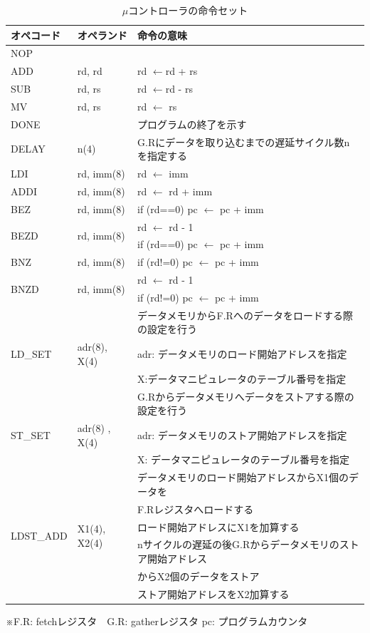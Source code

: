 {\begin{table}[p]
\begin{center}
\caption{$\mu$コントローラの命令セット}
\label{table:iset}
\begin{tabular}{|l|l|l|} \hline
オペコード & オペランド & 命令の意味 \\ \hline
NOP & & \\ \hline
ADD & rd, rd & rd $\leftarrow$rd + rs \\ \hline
SUB & rd, rs & rd $\leftarrow$rd - rs \\ \hline
MV & rd, rs & rd $\leftarrow$ rs\\ \hline
DONE & & プログラムの終了を示す\\ \hline
DELAY & n(4) & G.Rにデータを取り込むまでの遅延サイクル数nを指定する \\ \hline
LDI & rd, imm(8) & rd $\leftarrow$  imm \\ \hline
ADDI & rd, imm(8) & rd $\leftarrow$ rd  + imm \\ \hline
BEZ & rd, imm(8) & if (rd==0) pc $\leftarrow$ pc + imm \\ \hline
\multirow{2}{*}{BEZD} & \multirow{2}{*}{rd, imm(8)} & rd $\leftarrow$ rd - 1 \\
& &  if (rd==0) pc $\leftarrow$ pc + imm \\ \hline
BNZ & rd, imm(8) & if (rd!=0) pc $\leftarrow$ pc + imm \\ \hline
\multirow{2}{*}{BNZD} & \multirow{2}{*}{rd, imm(8)} &  rd $\leftarrow$ rd - 1\\ 
& & if (rd!=0) pc $\leftarrow$ pc + imm \\ \hline
& & データメモリからF.Rへのデータをロードする際の設定を行う \\
LD\_SET & adr(8), X(4) &  adr: データメモリのロード開始アドレスを指定　\\
& & X:データマニピュレータのテーブル番号を指定\\ \hline
& & G.Rからデータメモリへデータをストアする際の設定を行う \\
ST\_SET & adr(8) , X(4) &  adr: データメモリのストア開始アドレスを指定\\ 
& & X: データマニピュレータのテーブル番号を指定\\ \hline
\multirow{6}{*}{LDST\_ADD} &  \multirow{6}{*}{X1(4), X2(4)} & データメモリのロード開始アドレスからX1個のデータを \\
& & 						F.Rレジスタへロードする \\
& & 						ロード開始アドレスにX1を加算する　\\
& & 						 nサイクルの遅延の後G.Rからデータメモリのストア開始アドレス \\
& & 						からX2個のデータをストア　\\
& & 						ストア開始アドレスをX2加算する\\ \hline
\end{tabular}
\end{center}
※F.R: fetchレジスタ　G.R: gatherレジスタ pc: プログラムカウンタ
\end{table}

}
